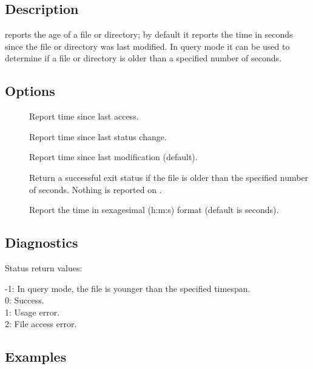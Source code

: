 \begin{synopsis}
\end{synopsis}

\subsection*{Description}

 reports the age of a file or directory; by default it reports the
time in seconds since the file or directory was last modified.  In query mode
it can be used to determine if a file or directory is older than a specified
number of seconds.

\subsection*{Options}

\begin{description}
\item[]
   Report time since last access.

\item[]
   Report time since last status change.

\item[]
   Report time since last modification (default).

\item[]
   Return a successful exit status if the file is older than the specified
   number of seconds.  Nothing is reported on .

\item[]
   Report the time in sexagesimal (h:m:s) format (default is seconds).
\end{description}

\subsection*{Diagnostics}

Status return values:
\begin{status}
  -1:  In query mode, the file is younger than the specified timespan.\\
   0:  Success.\\
   1:  Usage error.\\
   2:  File access error.
\end{status}

\subsection*{Examples}

